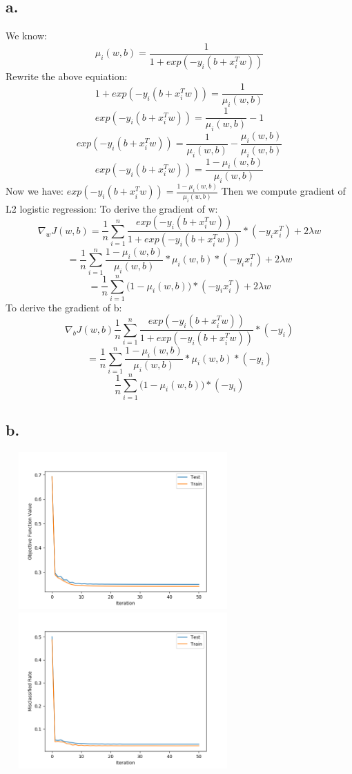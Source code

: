 \documentclass{article}
\begin{document}
\subsection*{a.}

We know:
\[ \mu_i(w, b) = \frac{1}{1 + exp(-y_i(b + x_i^Tw))} \]
Rewrite the above equiation:
\[ 1 + exp(-y_i(b + x_i^Tw)) = \frac{1}{\mu_i(w, b)} \]
\[  exp(-y_i(b + x_i^Tw)) = \frac{1}{\mu_i(w, b)} - 1 \]
\[ exp(-y_i(b + x_i^Tw)) = \frac{1}{\mu_i(w, b)} - \frac{\mu_i(w, b)}{\mu_i(w, b)} \]
\[ exp(-y_i(b + x_i^Tw)) = \frac{ 1 - \mu_i(w, b)}{\mu_i(w, b)} \]
Now we have: $exp(-y_i(b + x_i^Tw)) = \frac{ 1 - \mu_i(w, b)}{\mu_i(w, b)}$
Then we compute gradient of L2 logistic regression: \newline
To derive the gradient of w:
\[ \nabla_w J(w, b) = \frac{1}{n} \sum_{i=1}^{n} \frac{exp(-y_i(b + x_i^Tw))}{1 + exp(-y_i(b + x_i^Tw))} * (-y_ix_i^T) + 2 \lambda w \]
\[ = \frac{1}{n} \sum_{i=1}^{n} \frac{1 - \mu_i(w, b)}{\mu_i(w, b)} * \mu_i(w, b) * (-y_ix_i^T) + 2 \lambda w \]
\[ = \frac{1}{n} \sum_{i=1}^{n} \big(1 - \mu_i(w, b)\big) * (-y_ix_i^T) + 2\lambda w \]
To derive the gradient of b:
\[ \nabla_b J(w, b) \frac{1}{n} \sum_{i=1}^{n} \frac{exp(-y_i(b + x_i^Tw))}{1 + exp(-y_i(b + x_i^Tw))} * (-y_i) \]
\[ = \frac{1}{n} \sum_{i=1}^{n} \frac{1 - \mu_i(w, b)}{\mu_i(w, b)} * \mu_i(w, b) * (-y_i)\]
\[  \frac{1}{n} \sum_{i=1}^{n} \Big( 1 - \mu_i(w, b) \Big) * (-y_i) \]


\subsection*{b.}
\includegraphics[width=9cm, height=6cm]{A6_b_1.png}
\includegraphics[width=9cm, height=6cm]{A6_b_2.png}
\end{document}
